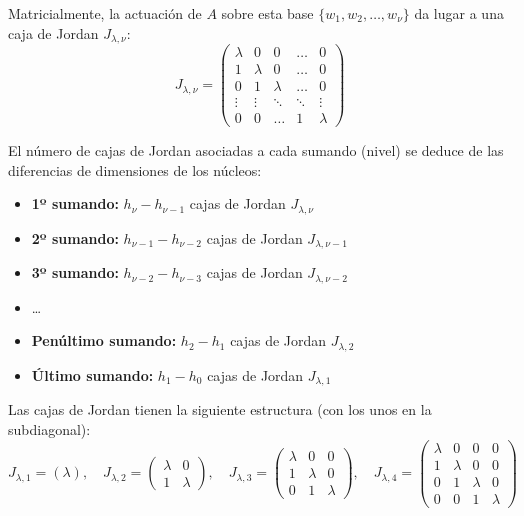 Matricialmente, la actuación de $A$ sobre esta base $\{w_1, w_2, \dots, w_\nu\}$ da lugar a una caja de Jordan $J_{\lambda, \nu}$:
\[
    J_{\lambda, \nu} = \begin{pmatrix} 
    \lambda & 0 & 0 & \dots & 0 \\ 
    1 & \lambda & 0 & \dots & 0 \\ 
    0 & 1 & \lambda & \dots & 0 \\ 
    \vdots & \vdots & \ddots & \ddots & \vdots \\ 
    0 & 0 & \dots & 1 & \lambda 
    \end{pmatrix}
\]

El número de cajas de Jordan asociadas a cada sumando (nivel) se deduce de las diferencias de dimensiones de los núcleos:
\begin{itemize}
    \item \textbf{1º sumando:} $h_\nu - h_{\nu-1}$ cajas de Jordan $J_{\lambda, \nu}$
    \item \textbf{2º sumando:} $h_{\nu-1} - h_{\nu-2}$ cajas de Jordan $J_{\lambda, \nu-1}$
    \item \textbf{3º sumando:} $h_{\nu-2} - h_{\nu-3}$ cajas de Jordan $J_{\lambda, \nu-2}$
    \item \dots
    \item \textbf{Penúltimo sumando:} $h_2 - h_1$ cajas de Jordan $J_{\lambda, 2}$
    \item \textbf{Último sumando:} $h_1 - h_0$ cajas de Jordan $J_{\lambda, 1}$
\end{itemize}

Las cajas de Jordan tienen la siguiente estructura (con los unos en la subdiagonal):
\[
    J_{\lambda, 1} = (\lambda), \quad 
    J_{\lambda, 2} = \begin{pmatrix} \lambda & 0 \\ 1 & \lambda \end{pmatrix}, \quad 
    J_{\lambda, 3} = \begin{pmatrix} \lambda & 0 & 0 \\ 1 & \lambda & 0 \\ 0 & 1 & \lambda \end{pmatrix}, \quad 
    J_{\lambda, 4} = \begin{pmatrix} \lambda & 0 & 0 & 0 \\ 1 & \lambda & 0 & 0 \\ 0 & 1 & \lambda & 0 \\ 0 & 0 & 1 & \lambda \end{pmatrix}
\]

